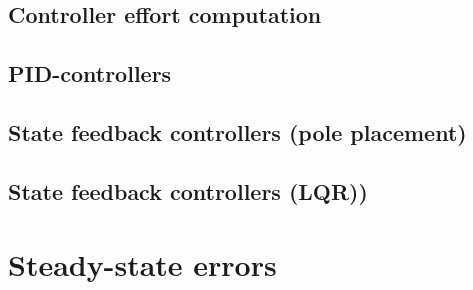 \subsection{Controller effort computation}

\subsection{PID-controllers}
\subsection{State feedback controllers (pole placement)}
\subsection{State feedback controllers (LQR))}

\section{Steady-state errors}
\label{sec:q12}